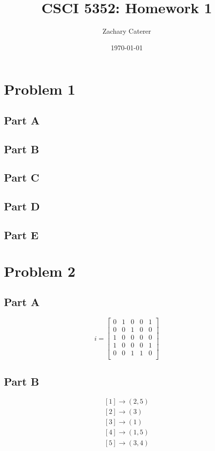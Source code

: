 \documentclass[12pt]{article}
\title{CSCI 5352: Homework 1}
\author{Zachary Caterer}
\date{\today}
\begin{document}
\maketitle

\section*{Problem 1}
\subsection*{Part A}
\subsection*{Part B}
\subsection*{Part C}
\subsection*{Part D}
\subsection*{Part E}

\section*{Problem 2}

\subsection*{Part A}

\[
i = \begin{bmatrix}
0 & 1 & 0 & 0 & 1 \\ 
0 & 0 & 1 & 0 & 0 \\ 
1 & 0 & 0 & 0 & 0 \\ 
1 & 0 & 0 & 0 & 1 \\ 
0 & 0 & 1 & 1 & 0 \\
\end{bmatrix}
\]


\subsection*{Part B}

\[
\begin{matrix}
[1] \to (2, 5) \\
[2] \to (3) \\
[3] \to (1) \\
[4] \to (1, 5) \\
[5] \to (3, 4) \\
\end{matrix}
\]
\end{document}
